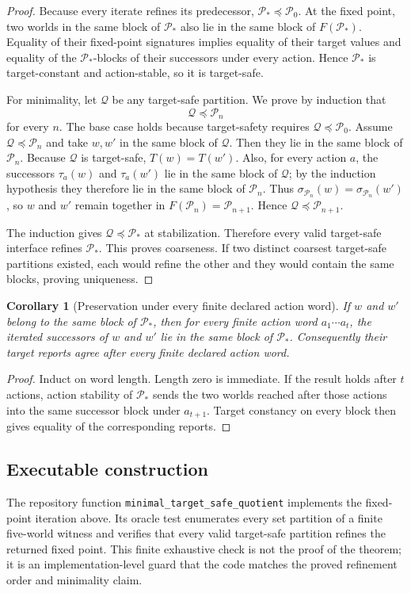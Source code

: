 \documentclass[11pt]{article}
\newtheorem{corollary}{Corollary}
\newcommand{\Pcal}{\mathcal{P}}
\newcommand{\Qcal}{\mathcal{Q}}
\begin{document}
\begin{proof}
Because every iterate refines its predecessor, $\Pcal_*\preceq\Pcal_0$. At the fixed point, two worlds in the same block of $\Pcal_*$ also lie in the same block of $F(\Pcal_*)$. Equality of their fixed-point signatures implies equality of their target values and equality of the $\Pcal_*$-blocks of their successors under every action. Hence $\Pcal_*$ is target-constant and action-stable, so it is target-safe.

For minimality, let $\Qcal$ be any target-safe partition. We prove by induction that
\[
\Qcal\preceq\Pcal_n
\]
for every $n$. The base case holds because target-safety requires $\Qcal\preceq\Pcal_0$. Assume $\Qcal\preceq\Pcal_n$ and take $w,w'$ in the same block of $\Qcal$. Then they lie in the same block of $\Pcal_n$. Because $\Qcal$ is target-safe, $T(w)=T(w')$. Also, for every action $a$, the successors $\tau_a(w)$ and $\tau_a(w')$ lie in the same block of $\Qcal$; by the induction hypothesis they therefore lie in the same block of $\Pcal_n$. Thus $\sigma_{\Pcal_n}(w)=\sigma_{\Pcal_n}(w')$, so $w$ and $w'$ remain together in $F(\Pcal_n)=\Pcal_{n+1}$. Hence $\Qcal\preceq\Pcal_{n+1}$.

The induction gives $\Qcal\preceq\Pcal_*$ at stabilization. Therefore every valid target-safe interface refines $\Pcal_*$. This proves coarseness. If two distinct coarsest target-safe partitions existed, each would refine the other and they would contain the same blocks, proving uniqueness.
\end{proof}

\begin{corollary}[Preservation under every finite declared action word]
If $w$ and $w'$ belong to the same block of $\Pcal_*$, then for every finite action word $a_1\cdots a_t$, the iterated successors of $w$ and $w'$ lie in the same block of $\Pcal_*$. Consequently their target reports agree after every finite declared action word.
\end{corollary}

\begin{proof}
Induct on word length. Length zero is immediate. If the result holds after $t$ actions, action stability of $\Pcal_*$ sends the two worlds reached after those actions into the same successor block under $a_{t+1}$. Target constancy on every block then gives equality of the corresponding reports.
\end{proof}

\subsection{Executable construction}
The repository function \texttt{minimal\_target\_safe\_quotient} implements the fixed-point iteration above. Its oracle test enumerates every set partition of a finite five-world witness and verifies that every valid target-safe partition refines the returned fixed point. This finite exhaustive check is not the proof of the theorem; it is an implementation-level guard that the code matches the proved refinement order and minimality claim.
\end{document}
